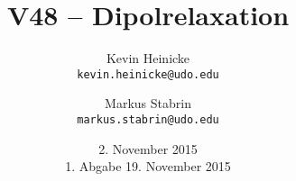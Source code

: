 



\title{%
    V48 -- Dipolrelaxation
}
\author{%
    Kevin Heinicke\\
    \texttt{kevin.heinicke@udo.edu}
    \and
    Markus Stabrin\\
    \texttt{markus.stabrin@udo.edu}
}
\date{%
    2. November 2015\\
    {\small 1. Abgabe} 19. November 2015\\
}

    \maketitle%
    \tableofcontents
    \newpage
    
    

    \printbibliography

